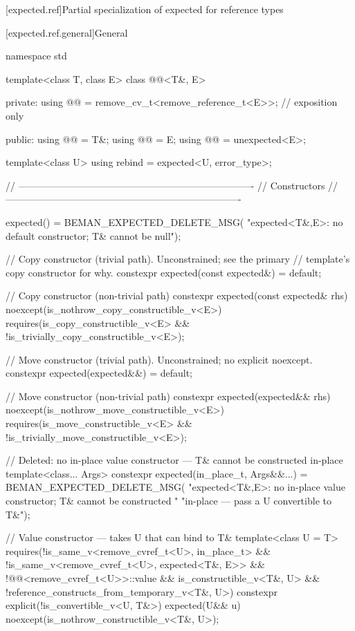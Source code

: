 [expected.ref]{Partial specialization of expected for reference types}

[expected.ref.general]{General}

\begin{codeblock}
namespace std {
  template<class T, class E>
  class @@<T&, E> {
  private:
    using @@ = remove_cv_t<remove_reference_t<E>>; // exposition only

  public:
    using @@ = T&;
    using @@ = E;
    using @@ = unexpected<E>;

    template<class U> using rebind = expected<U, error_type>;

    // -------------------------------------------------------------------------
    // Constructors
    // -------------------------------------------------------------------------

    expected() = BEMAN_EXPECTED_DELETE_MSG(
        "expected<T&,E>: no default constructor; T& cannot be null");

    // Copy constructor (trivial path). Unconstrained; see the primary
    // template's copy constructor for why.
    constexpr expected(const expected&) = default;

    // Copy constructor (non-trivial path)
    constexpr expected(const expected& rhs) noexcept(is_nothrow_copy_constructible_v<E>)
      requires(is_copy_constructible_v<E> && !is_trivially_copy_constructible_v<E>);

    // Move constructor (trivial path). Unconstrained; no explicit noexcept.
    constexpr expected(expected&&) = default;

    // Move constructor (non-trivial path)
    constexpr expected(expected&& rhs) noexcept(is_nothrow_move_constructible_v<E>)
      requires(is_move_constructible_v<E> && !is_trivially_move_constructible_v<E>);

    // Deleted: no in-place value constructor — T& cannot be constructed in-place
    template<class... Args>
    constexpr expected(in_place_t, Args&&...) = BEMAN_EXPECTED_DELETE_MSG(
        "expected<T&,E>: no in-place value constructor; T& cannot be constructed "
        "in-place — pass a U convertible to T&");

    // Value constructor — takes U that can bind to T&
    template<class U = T>
      requires(!is_same_v<remove_cvref_t<U>, in_place_t> &&
               !is_same_v<remove_cvref_t<U>, expected<T&, E>> &&
               !@@<remove_cvref_t<U>>::value &&
               is_constructible_v<T&, U> && !reference_constructs_from_temporary_v<T&, U>)
    constexpr explicit(!is_convertible_v<U, T&>)
        expected(U&& u) noexcept(is_nothrow_constructible_v<T&, U>);

}}
\end{codeblock}
